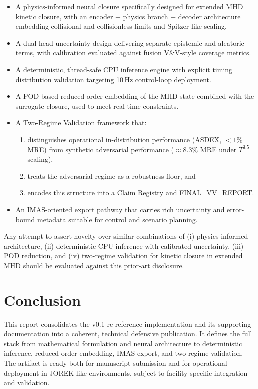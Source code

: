 \documentclass[11pt]{article}
\begin{document}
\begin{itemize}
  \item A physics-informed neural closure specifically designed for extended MHD kinetic closure, with an encoder + physics branch + decoder architecture embedding collisional and collisionless limits and Spitzer-like scaling.
  \item A dual-head uncertainty design delivering separate epistemic and aleatoric terms, with calibration evaluated against fusion V\&V-style coverage metrics.
  \item A deterministic, thread-safe CPU inference engine with explicit timing distribution validation targeting 10\,Hz control-loop deployment.
  \item A POD-based reduced-order embedding of the MHD state combined with the surrogate closure, used to meet real-time constraints.
  \item A Two-Regime Validation framework that:
    \begin{enumerate}[label=(\roman*)]
      \item distinguishes operational in-distribution performance (ASDEX, $<1\%$ MRE) from synthetic adversarial performance ($\approx 8.3\%$ MRE under $T^{3.5}$ scaling),
      \item treats the adversarial regime as a robustness floor, and
      \item encodes this structure into a Claim Registry and FINAL\_VV\_REPORT.
    \end{enumerate}
  \item An IMAS-oriented export pathway that carries rich uncertainty and error-bound metadata suitable for control and scenario planning.
\end{itemize}

Any attempt to assert novelty over similar combinations of (i) physics-informed architecture, (ii) deterministic CPU inference with calibrated uncertainty, (iii) POD reduction, and (iv) two-regime validation for kinetic closure in extended MHD should be evaluated against this prior-art disclosure.

\section{Conclusion}

This report consolidates the v0.1-rc reference implementation and its supporting documentation into a coherent, technical defensive publication. It defines the full stack from mathematical formulation and neural architecture to deterministic inference, reduced-order embedding, IMAS export, and two-regime validation. The artifact is ready both for manuscript submission and for operational deployment in JOREK-like environments, subject to facility-specific integration and validation.
\end{document}
